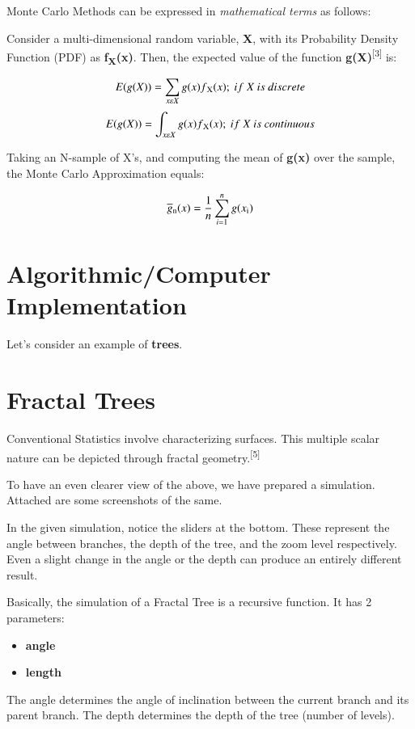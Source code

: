 \documentclass{resonance}
\begin{document}
Monte Carlo Methods can be expressed in \textit{mathematical terms} as follows:

Consider a multi-dimensional random variable, \textbf{X}, with its Probability Density Function (PDF) as \textbf{f\textsubscript{X}(x)}. Then, the expected value of the function \textbf{g(X)}\textsuperscript{[3]} is:

$$E(g(X)) = \sum_{x\varepsilon X} g(x)f\textsubscript{X}(x);\ if\ X\ is\ discrete$$
$$E(g(X)) = \int_{x\varepsilon X} g(x)f\textsubscript{X}(x);\ if\ X\ is\ continuous$$

Taking an N-sample of X’s, and computing the mean of \textbf{g(x)} over the sample, the Monte Carlo Approximation equals:

$$ \overline{g}\textsubscript{n}(x) = \frac{1}{n} \sum_{i=1}^{n}g(x\textsubscript{i}) $$

\section*{Algorithmic/Computer Implementation}
Let's consider an example of \textbf{trees}.


\setlength{\leftskip}{0cm}
\section{Fractal Trees}

Conventional Statistics involve characterizing surfaces. This multiple scalar nature can be depicted through fractal geometry.\textsuperscript{[5]}

To have an even clearer view of the above, we have prepared a simulation. Attached are some screenshots of the same.

In the given simulation, notice the sliders at the bottom. These represent the angle between branches, the depth of the tree, and the zoom level respectively. Even a slight change in the angle or the depth can produce an entirely different result.

Basically, the simulation of a Fractal Tree is a recursive function. It has 2 parameters:
\begin{itemize}
    \item \textbf{angle}
    \item \textbf{length}
\end{itemize}

The angle determines the angle of inclination between the current branch and its parent branch. The depth determines the depth of the tree (number of levels).
\end{document}
